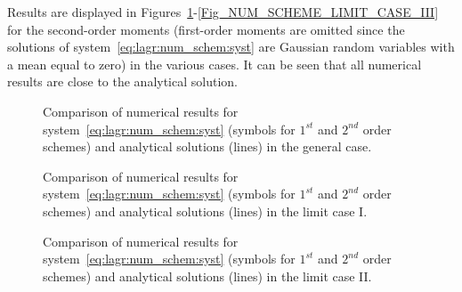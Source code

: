 Results are displayed in Figures~\ref{Fig_NUM_SCHEME_GENERAL_CASE}-\ref{Fig_NUM_SCHEME_LIMIT_CASE_III} for the second-order moments (first-order moments are omitted since the solutions of system~\ref{eq:lagr:num_schem:syst} are Gaussian random variables with a mean equal to zero) in the various cases. It can be seen that all numerical results are close to the analytical solution.
\begin{figure}[H]
  \centering
  \caption{Comparison of numerical results for system~\ref{eq:lagr:num_schem:syst} (symbols for $1^{st}$ and $2^{nd}$ order schemes) and analytical solutions (lines) in the general case.}
  \label{Fig_NUM_SCHEME_GENERAL_CASE}
\end{figure}

\begin{figure}[H]
  \centering
  \caption{Comparison of numerical results for system~\ref{eq:lagr:num_schem:syst} (symbols for $1^{st}$ and $2^{nd}$ order schemes) and analytical solutions (lines) in the limit case I.}
  \label{Fig_NUM_SCHEME_LIMIT_CASE_I}
\end{figure}

\begin{figure}[H]
  \centering
  \caption{Comparison of numerical results for system~\ref{eq:lagr:num_schem:syst} (symbols for $1^{st}$ and $2^{nd}$ order schemes) and analytical solutions (lines) in the limit case II.}
  \label{Fig_NUM_SCHEME_LIMIT_CASE_II}
\end{figure}

